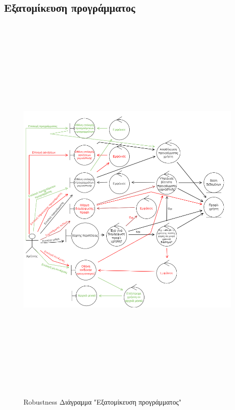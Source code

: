 \subsection{Εξατομίκευση προγράμματος}
\begin{figure}[!htb]
  \begin{center}
    \includegraphics[width=18cm,height=20cm]{robust_eksatom.png}
    \caption{Robustness Διάγραμμα "Εξατομίκευση προγράμματος"}
    \label{}
     \end{center}
\end{figure}
\newpage


